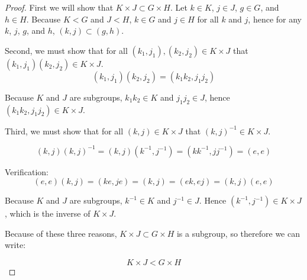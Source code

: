 \documentclass[a4paper]{article}
\begin{document}
\begin{myparindent}{0pt}
\begin{proof}
  First we will show that $K \times J \subset G \times H$. Let $k \in K$,
  $j \in J$, $g \in G$, and $h \in H$. Because $K < G$ and $J < H$, $k \in G$
  and $j \in H$ for all $k$ and $j$, hence for any $k$, $j$, $g$, and $h$,
  $(k, j) \subset (g, h)$. \newline

  Second, we must show that for all $(k_1, j_1), (k_2, j_2) \in K \times J$ that
  $(k_1, j_1)(k_2, j_2) \in K \times J$.
  \[ (k_1, j_1)(k_2, j_2) = (k_1 k_2, j_1 j_2) \]

  Because $K$ and $J$ are subgroups, $k_1 k_2 \in K$ and $j_1 j_2 \in J$, hence
  $(k_1 k_2, j_1 j_2) \in K \times J$. \newline

  Third, we must show that for all $(k, j) \in K \times J$ that
  $(k, j)^{-1} \in K \times J$.

  \[ (k, j)(k, j)^{-1} = (k, j)(k^{-1}, j^{-1}) = (kk^{-1}, jj^{-1}) = (e, e) \]

  Verification:
  \[ (e, e)(k, j) = (ke, je) = (k, j) = (ek, ej) = (k, j)(e, e) \]

  Because $K$ and $J$ are subgroups, $k^{-1} \in K$ and $j^{-1} \in J$.
  Hence $(k^{-1}, j^{-1}) \in K \times J$, which is the inverse of $K \times J$.
  \newline

  Because of these three reasons, $K \times J \subset G \times H$ is a subgroup,
  so therefore we can write:

  \[ K \times J < G \times H \]
\end{proof}

\end{myparindent}
\end{document}
